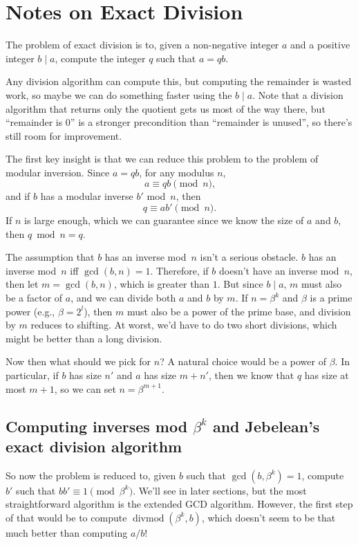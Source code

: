 \documentclass{computer-arithmetic}
\begin{document}
\section{Notes on Exact Division}

The problem of exact division is to, given a non-negative integer
\(a\) and a positive integer \(b \mid a\), compute the integer \(q\)
such that \(a = qb\).

Any division algorithm can compute this, but computing the remainder
is wasted work, so maybe we can do something faster using the
\(b \mid a\). Note that a division algorithm that returns only the
quotient gets us most of the way there, but ``remainder is 0'' is a
stronger precondition than ``remainder is unused'', so there's still
room for improvement.

The first key insight is that we can reduce this problem to the
problem of modular inversion. Since \(a = qb\), for any modulus \(n\),
\[
  a ≡ qb \pmod n\text{,}
\]
and if \(b\) has a modular inverse \(b'\) mod~\(n\), then
\[
  q ≡ ab' \pmod n\text{.}
\]
If \(n\) is large enough, which we can guarantee since we know the
size of \(a\) and \(b\), then \(q \bmod n = q\).

The assumption that \(b\) has an inverse mod~\(n\) isn't a serious
obstacle. \(b\) has an inverse mod~\(n\) iff \(\gcd(b, n) =
1\). Therefore, if \(b\) doesn't have an inverse mod~\(n\), then let
\(m = \gcd(b, n)\), which is greater than \(1\). But since
\(b \mid a\), \(m\) must also be a factor of \(a\), and we can divide
both \(a\) and \(b\) by \(m\). If \(n = β^k\) and \(β\) is a prime
power (e.g., \(β = 2^l\)), then \(m\) must also be a power of the
prime base, and division by \(m\) reduces to shifting. At worst, we'd
have to do two short divisions, which might be better than a long
division.

Now then what should we pick for \(n\)? A natural choice would be a
power of \(β\). In particular, if \(b\) has size \(n'\) and \(a\) has
size \(m + n'\), then we know that \(q\) has size at most \(m + 1\),
so we can set \(n = β^{m+1}\).

\subsection{Computing inverses mod \(β^k\) and Jebelean's exact division algorithm}

So now the problem is reduced to, given \(b\) such that
\(\gcd(b, β^k) = 1\), compute \(b'\) such that \(bb' ≡ 1 \pmod
β^k\). We'll see in later sections, but the most straightforward
algorithm is the extended GCD algorithm. However, the first step of
that would be to compute \(\operatorname{divmod}(β^k, b)\), which
doesn't seem to be that much better than computing \(a/b\)!
\end{document}
